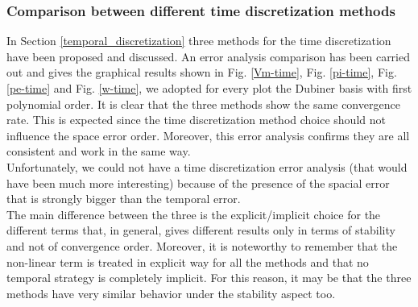 \documentclass[a4paper,11pt]{article}
\begin{document}
\subsubsection{Comparison between different time discretization methods}
In Section \ref{temporal_discretization} three methods for the time discretization have been proposed and discussed. An error analysis comparison has been carried out and gives the graphical results shown in Fig. \ref{Vm-time}, Fig. \ref{pi-time}, Fig. \ref{pe-time} and Fig. \ref{w-time}, we adopted for every plot the Dubiner basis with first polynomial order.
\noindent It is clear that the three methods show the same convergence rate. This is expected since the time discretization method choice should not influence the space error order. Moreover, this error analysis confirms they are all consistent and work in the same way. \\
Unfortunately, we could not have a time discretization error analysis (that would have been much more interesting) because of the presence of the spacial error that is strongly bigger than the temporal error. \\
The main difference between the three is the explicit/implicit choice for the different terms that, in general, gives different results only in terms of stability and not of convergence order. Moreover, it is noteworthy to remember that the non-linear term is treated in explicit way for all the methods and that no temporal strategy is completely implicit. For this reason, it may be that the three methods have very similar behavior under the stability aspect too.
\end{document}
